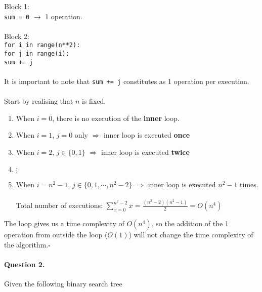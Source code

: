 \documentclass[12pt]{article}
\newcommand{\EOQ}{\hfill $\square$}
\begin{document}
\begin{enumerate}[(a)]
Block 1:\\
\verb|sum = 0| $\rightarrow$ 1 operation.\\\\Block 2:\\
\verb|for i in range(n**2):|\\\hspace*{0.6cm}\verb|for j in range(i):|\\\hspace*{1.2cm}\verb|sum += j|\\\\It is important to note that \verb|sum += j| constitutes as 1 operation per execution.\\\\Start by realising that $n$ is fixed.

\begin{enumerate}[(1)]
\item When $i=0$, there is no execution of the \textbf{inner} loop.
\item When $i=1$, $j=0$ only $\Rightarrow$ inner loop is executed \textbf{once}
\item When $i=2$, $j\in\{0,1\}$ $\Rightarrow$ inner loop is executed \textbf{twice}
\item {$\vdots$}
\item When $i=n^2-1$, $j\in\{0,1,\cdots,n^2-2\}$ $\Rightarrow$ inner loop is executed \textbf{$n^2-1$} times.\\\\
Total number of executions: $\sum\limits_{x=0}^{n^2-2}x=\frac{(n^2-2)(n^2-1)}{2}=O(n^4)$
\end{enumerate}
The loop gives us a time complexity of $O(n^4)$, so the addition of the 1 operation from outside the loop ($O(1)$) will not change the time complexity of the algorithm.\EOQ
\end{enumerate}
\paragraph{Question 2.} Given the following binary search tree
\end{document}
